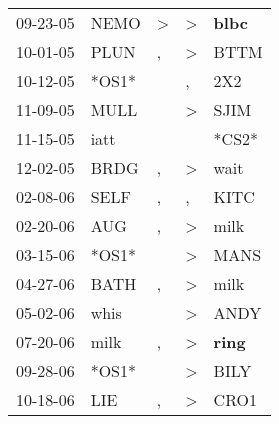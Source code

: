 \begin{supertabular}{p{0.07\textwidth}p{0.06\textwidth}p{0.02\textwidth}p{0.02\textwidth}p{0.06\textwidth}}
          09-23-05\textsuperscript{} &           NEMO\textsuperscript{} &     \textgreater &     \textgreater &  \textbf{blbc\textsuperscript{}} \\
          10-01-05\textsuperscript{} &           PLUN\textsuperscript{} &                , &     \textgreater &           BTTM\textsuperscript{} \\
          10-12-05\textsuperscript{} &                            *OS1* &                  &                , &            2X2\textsuperscript{} \\
          11-09-05\textsuperscript{} &           MULL\textsuperscript{} &                  &     \textgreater &           SJIM\textsuperscript{} \\
          11-15-05\textsuperscript{} &           iatt\textsuperscript{} &                  &                  &                            *CS2* \\
          12-02-05\textsuperscript{} &           BRDG\textsuperscript{} &                , &     \textgreater &           wait\textsuperscript{} \\
          02-08-06\textsuperscript{} &           SELF\textsuperscript{} &                , &                , &           KITC\textsuperscript{} \\
          02-20-06\textsuperscript{} &            AUG\textsuperscript{} &                , &     \textgreater &           milk\textsuperscript{} \\
          03-15-06\textsuperscript{} &                            *OS1* &                  &     \textgreater &           MANS\textsuperscript{} \\
          04-27-06\textsuperscript{} &           BATH\textsuperscript{} &                , &     \textgreater &           milk\textsuperscript{} \\
          05-02-06\textsuperscript{} &           whis\textsuperscript{} &                  &     \textgreater &           ANDY\textsuperscript{} \\
          07-20-06\textsuperscript{} &           milk\textsuperscript{} &                , &     \textgreater &  \textbf{ring\textsuperscript{}} \\
          09-28-06\textsuperscript{} &                            *OS1* &                  &     \textgreater &           BILY\textsuperscript{} \\
          10-18-06\textsuperscript{} &            LIE\textsuperscript{} &                , &     \textgreater &           CRO1\textsuperscript{} \\

\end{supertabular}
